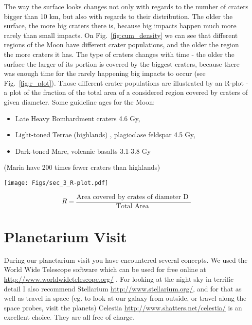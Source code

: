 \documentclass[paper=a4, fontsize=11pt]{scrartcl} %
\numberwithin{equation}{section} %
\begin{document}
The way the surface looks changes not only with regards to the number of craters bigger than
10 km, but also with regards to their distribution. The older the surface, the more big craters
there is, because big impacts happen much more rarely than small impacts. On Fig.~\ref{fig:cum_density} we
can see that different regions of the Moon have different crater populations, and the older the
region the more craters it has. The type of craters changes with time - the older the surface the
larger of its portion is covered by the biggest craters, because there was enough time for the
rarely happening big impacts to occur (see Fig.~\ref{fig:r_plot}). Those different crater populations are
illustrated by an R-plot - a plot of the fraction of the total area of a considered region covered by craters of given diameter. Some guideline ages for the Moon: 

\begin{itemize}
 \item Late Heavy Bombardment craters 4.6 Gy, 
 \item Light-toned Terrae (highlands) , plagioclase feldspar 4.5 Gy, 
 \item Dark-toned Mare, volcanic basalts 3.1-3.8 Gy   
\end{itemize}
(Maria have 200 times fewer craters than highlands)


\begin{figure*}
\centering
	\texttt{[image: Figs/sec\_3\_R-plot.pdf]}
	\caption[impact rate]{The R-plot shows different populations of craters on surfaces of different age}
	\label{fig:r_plot}
\end{figure*} 

\begin{equation*}
R = \frac{ \mbox{Area covered by crates of diameter D }}{  \mbox{Total Area }}
\end{equation*}



\newpage 
\section{Planetarium Visit}

During our planetarium visit you have encountered several concepts. We used the World Wide Telescope software which can be used for free online at \url{http://www.worldwidetelescope.org/} . For looking at the night sky in terrific detail I also recommend  Stellarium \url{http://www.stellarium.org/}, and for that as well as travel in space (eg. to look at our galaxy from outside, or travel along the space probes, visit the planets) Celestia \url{http://www.shatters.net/celestia/} is an excellent choice. They are all free of charge. 
\end{document}
